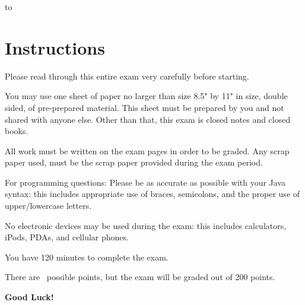 \documentclass[11pt]{exam}
\begin{document}
\vspace{3.0in}
\begin{center} 
\end{center} 

\lstset{language=Python,numbers=left}

\vspace{0.1in} 
\hbox to \textwidth{Name:\enspace\hrulefill} 

\section*{Instructions}
Please read through this entire exam very carefully before starting.
\par
You may use one sheet of paper no larger than size 8.5" by 11" in size, double sided, of pre-prepared material.   This sheet must be prepared by you and not shared with anyone else. \newline
Other than that, this exam is closed notes and closed books.
\par
All work must be written on the exam pages in order to be graded.   Any scrap paper used, must be the scrap paper provided during the exam period.
\par
For programming questions: Please be as accurate as possible with your Java syntax: this includes appropriate use of braces, semicolons, and the proper use of upper/lowercase letters.  
\par
No electronic devices may be used during the exam: this includes calculators, iPods, PDAs, and cellular phones.
\par
You have 120 minutes to complete the exam.  
\par
There are \numpoints\ possible points, but the exam will be graded out of 200 points.
\par
{\bf Good Luck!}


\pagebreak
\end{document}
